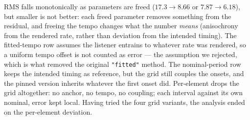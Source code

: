 \documentclass[11pt]{article}
\begin{document}
RMS falls monotonically as parameters are freed ($17.3 \to 8.66$ or
$7.87 \to 6.18$), but smaller is not better: each freed parameter removes
something from the residual, and freeing the tempo changes what the number
\emph{means} (anisochrony from the rendered rate, rather than deviation from the
intended timing). The fitted-tempo row assumes the listener entrains to whatever
rate was rendered, so a uniform tempo offset is not counted as error --- the
assumption we rejected, which is what removed the original \texttt{"fitted"}
method. The nominal-period row keeps the intended timing as reference, but the
grid still couples the onsets, and the pinned version inherits whatever the first
onset did. Per-element drops the grid altogether: no anchor, no tempo, no
coupling; each interval against its own nominal, error kept local. Having tried
the four grid variants, the analysis ended on the per-element deviation.
\end{document}
